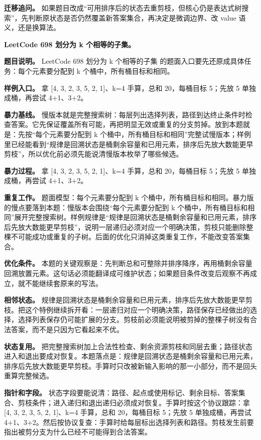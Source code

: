 \textbf{迁移追问。} 如果题目改成“可用排序后的状态去重剪枝，但核心仍是表达式树搜索”，先判断原状态是否仍然覆盖新答案集合，再决定是微调边界、改 value 语义，还是换算法。

\noindent\textbf{LeetCode 698 划分为 k 个相等的子集。}

\textbf{题目说明。} LeetCode 698 划分为 k 个相等的子集 的题面入口要先还原成具体任务：每个元素要分配到 k 个桶中，所有桶目标和相同。

\textbf{样例入口。} 拿 [4, 3, 2, 3, 5, 2, 1]、k=4 手算，总和 20，每桶目标 5；先放 5 单独成桶，再尝试 4+1、3+2。

\textbf{暴力基线。} 慢版本就是完整搜索树：每层列出选择列表，路径到达终止条件时检查答案。它先保证覆盖所有可能，再把明显无效或重复的分支剪掉。放到本题就是：先按“每个元素要分配到 k 个桶中，所有桶目标和相同”完整试慢版本；样例里已经能看到“规律是回溯状态是桶剩余容量和已用元素，排序后先放大数能更早剪枝”，所以优化前必须先能说清慢版本枚举了哪些候选。

\textbf{暴力过程。} 拿 [4, 3, 2, 3, 5, 2, 1]、k=4 手算，总和 20，每桶目标 5；先放 5 单独成桶，再尝试 4+1、3+2。

\textbf{重复工作。} 题面模型：每个元素要分配到 k 个桶中，所有桶目标和相同。暴力版的慢点要落到本题：慢版本会围绕“每个元素要分配到 k 个桶中，所有桶目标和相同”展开完整搜索树。样例规律是“规律是回溯状态是桶剩余容量和已用元素，排序后先放大数能更早剪枝”，说明一层递归必须对应一个明确决策，剪枝只能删除整棵不可能成功或重复的子树。后面的优化只消掉这类重复工作，不能改变答案集合。

\textbf{优化条件。} 本题的关键观察是：先判断总和可整除并排序降序，再用桶剩余容量回溯放置元素。这句话必须能翻译成可维护状态；如果题目条件改变后观察不再成立，就不能继续套原来的写法。

\textbf{相邻状态。} 规律是回溯状态是桶剩余容量和已用元素，排序后先放大数能更早剪枝。把这个特例继续拆开看：一层递归对应一个明确决策，路径保存已经做出的选择，选择列表保存仍可能扩展的分支。剪枝前必须能说明被剪掉的整棵子树没有合法答案，而不是只因为它看起来不优。

\textbf{状态复用。} 把完整搜索树加上合法性检查、剩余资源剪枝和同层去重；路径状态进入和退出要成对恢复。本题落点是：规律是回溯状态是桶剩余容量和已用元素，排序后先放大数能更早剪枝。手算时只改被新输入影响的那一小部分，而不是回头重算完整候选。

\textbf{指针和字段。} 状态字段要能说清：路径、起点或使用标记、剩余目标、答案集合、剪枝条件；进入递归和退出递归必须成对恢复。手算时按这个协议跟踪：拿 [4, 3, 2, 3, 5, 2, 1]、k=4 手算，总和 20，每桶目标 5；先放 5 单独成桶，再尝试 4+1、3+2。然后按协议复查：手算时给每层标出选择列表和路径。剪枝发生前要指出被剪分支为什么已经不可能得到合法答案。

